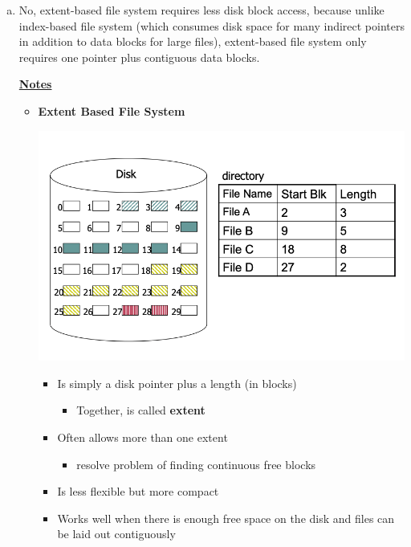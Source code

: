 \documentclass[12pt]{article}
\begin{document}
\begin{enumerate}[1.]
\begin{enumerate}[a)]
        \item

        \bigskip

        No, extent-based file system requires less disk block access, because unlike
        index-based file system (which consumes disk space for many indirect pointers
        in addition to data blocks for large files), extent-based file system only
        requires one pointer plus contiguous data blocks.

        \bigskip

        \underline{\textbf{Notes}}

        \begin{itemize}
            \item \textbf{Extent Based File System}

            \begin{center}
            \includegraphics[width=\linewidth]{images/midterm_1_solution_14.png}
            \end{center}

            \begin{itemize}
                \item Is simply a disk pointer plus a length (in blocks)
                \begin{itemize}
                    \item Together, is called \textbf{extent}
                \end{itemize}
                \item Often allows more than one extent
                \begin{itemize}
                    \item resolve problem of finding continuous free blocks
                \end{itemize}
                \item Is less flexible but more compact
                \item Works well when there is enough free space on the disk and
                files can be laid out contiguously
            \end{itemize}


\end{itemize}
\end{enumerate}
\end{enumerate}
\end{document}
